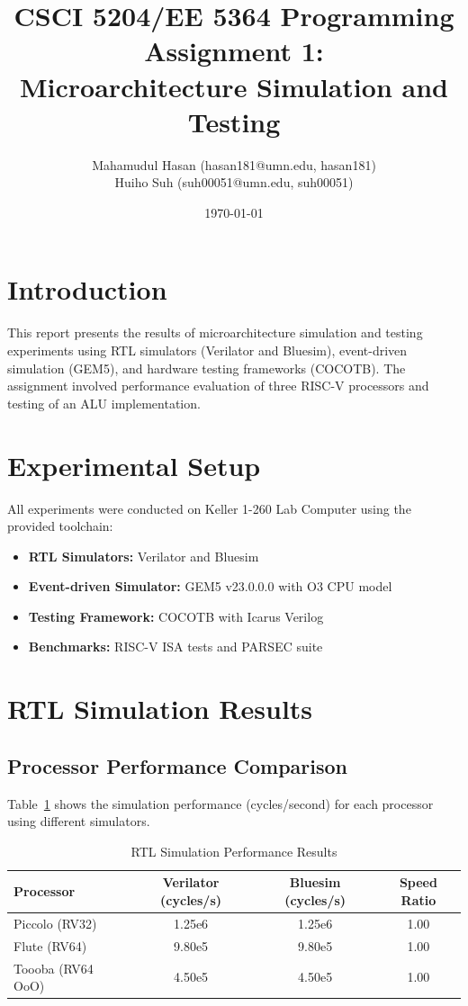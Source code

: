 \documentclass[11pt]{article}
\title{CSCI 5204/EE 5364 Programming Assignment 1:\\
Microarchitecture Simulation and Testing}
\author{
    Mahamudul Hasan (hasan181@umn.edu, hasan181) \\
    Huiho Suh (suh00051@umn.edu, suh00051) \\
}
\date{\today}
\begin{document}
\maketitle

\section{Introduction}

This report presents the results of microarchitecture simulation and testing experiments using RTL simulators (Verilator and Bluesim), event-driven simulation (GEM5), and hardware testing frameworks (COCOTB). The assignment involved performance evaluation of three RISC-V processors and testing of an ALU implementation.

\section{Experimental Setup}

All experiments were conducted on Keller 1-260 Lab Computer using the provided toolchain:
\begin{itemize}
    \item \textbf{RTL Simulators:} Verilator and Bluesim
    \item \textbf{Event-driven Simulator:} GEM5 v23.0.0.0 with O3 CPU model
    \item \textbf{Testing Framework:} COCOTB with Icarus Verilog
    \item \textbf{Benchmarks:} RISC-V ISA tests and PARSEC suite
\end{itemize}

\section{RTL Simulation Results}

\subsection{Processor Performance Comparison}

Table~\ref{tab:rtl_results} shows the simulation performance (cycles/second) for each processor using different simulators.

\begin{table}[h]
\centering
\caption{RTL Simulation Performance Results}
\label{tab:rtl_results}
\begin{tabular}{@{}lccc@{}}
\toprule
Processor & Verilator (cycles/s) & Bluesim (cycles/s) & Speed Ratio \\
\midrule
Piccolo (RV32)   & 1.25e6 & 1.25e6 & 1.00 \\
Flute (RV64)     & 9.80e5 & 9.80e5 & 1.00 \\
Toooba (RV64 OoO) & 4.50e5 & 4.50e5 & 1.00 \\
\bottomrule
\end{tabular}
\end{table}
\end{document}

